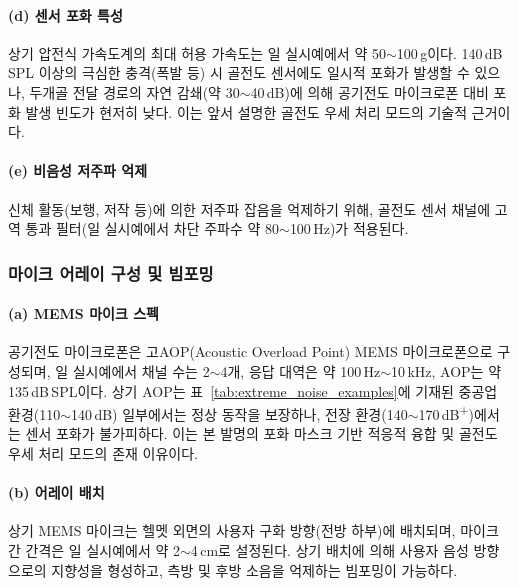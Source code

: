 \documentclass{article}
\DeclareRobustCommand{\codexedit}[1]{\textcolor{customorange}{#1}}
\begin{document}
\paragraph{(d) 센서 포화 특성}

\codexedit{상기 압전식 가속도계의 최대 허용 가속도는 일 실시예에서 약 50$\sim$100\,g이다. 140\,dB\,SPL 이상의 극심한 충격(폭발 등) 시 골전도 센서에도 일시적 포화가 발생할 수 있으나, 두개골 전달 경로의 자연 감쇄(약 30$\sim$40\,dB)에 의해 공기전도 마이크로폰 대비 포화 발생 빈도가 현저히 낮다. 이는 앞서 설명한 골전도 우세 처리 모드의 기술적 근거이다.}

\paragraph{(e) 비음성 저주파 억제}

신체 활동(보행, 저작 등)에 의한 저주파 잡음을 억제하기 위해, 골전도 센서 채널에 고역 통과 필터(일 실시예에서 차단 주파수 약 80$\sim$100\,Hz)가 적용된다.

\subsubsection{마이크 어레이 구성 및 빔포밍}

\paragraph{(a) MEMS 마이크 스펙}

\codexedit{공기전도 마이크로폰은 고AOP(Acoustic Overload Point) MEMS 마이크로폰으로 구성되며, 일 실시예에서 채널 수는 2$\sim$4개, 응답 대역은 약 100\,Hz$\sim$10\,kHz, AOP는 약 135\,dB\,SPL이다. 상기 AOP는 표~\ref{tab:extreme_noise_examples}에 기재된 중공업 환경(110$\sim$140\,dB) 일부에서는 정상 동작을 보장하나, 전장 환경(140$\sim$170\,dB\textsuperscript{+})에서는 센서 포화가 불가피하다. 이는 본 발명의 포화 마스크 기반 적응적 융합 및 골전도 우세 처리 모드의 존재 이유이다.}

\paragraph{(b) 어레이 배치}

상기 MEMS 마이크는 헬멧 외면의 사용자 구화 방향(전방 하부)에 배치되며, 마이크 간 간격은 일 실시예에서 약 2$\sim$4\,cm로 설정된다. 상기 배치에 의해 사용자 음성 방향으로의 지향성을 형성하고, 측방 및 후방 소음을 억제하는 빔포밍이 가능하다.
\end{document}
